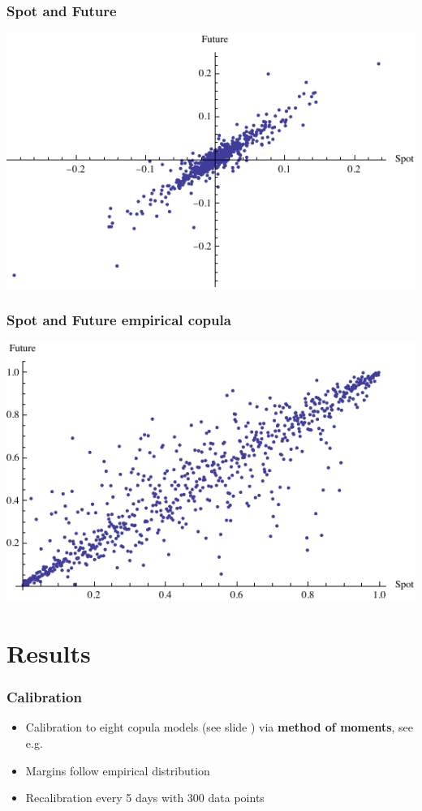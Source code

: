 \documentclass[10pt,mathserif,notes=show]{beamer}
\renewcommand{\(}{\begin{columns}}
\renewcommand{\)}{\end{columns}}
\newcommand{\<}[1]{\begin{column}{#1}}
\renewcommand{\>}{\end{column}}
\theoremstyle{definition}
\begin{document}
\begin{frame}
  \frametitle{Spot and Future}
  \begin{center}
    \includegraphics[scale=1]{../_pics/btc_future_scatter.pdf}
  \end{center}
\end{frame}

\begin{frame}
  \frametitle{Spot and Future empirical copula}
  \begin{center}
    \includegraphics[scale=1]{../_pics/btc_future_copula_scatter.pdf}
  \end{center}
\end{frame}

\section{Results}

\begin{frame}
  \frametitle{Calibration}
  \begin{itemize}
  \item Calibration to eight copula models (see slide
    \hyperlink{copulas}{}) via {\bf method
      of moments}, see e.g.\ \citep{Genest1993,Oh2013}
  \item Margins follow empirical distribution
  \item Recalibration every 5 days with 300 data points
  \end{itemize}
\end{frame}
\end{document}
